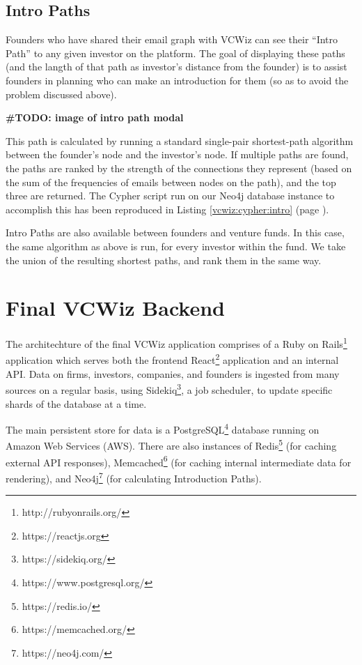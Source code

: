 \subsection{Intro Paths}

Founders who have shared their email graph with VCWiz can see their ``Intro Path'' to any given investor on the platform. The goal of displaying these paths (and the langth of that path as investor's distance from the founder) is to assist founders in planning who can make an introduction for them (so as to avoid the problem discussed above).

\textbf{\#TODO: image of intro path modal}

This path is calculated by running a standard single-pair shortest-path algorithm between the founder's node and the investor's node. If multiple paths are found, the paths are ranked by the strength of the connections they represent (based on the sum of the frequencies of emails between nodes on the path), and the top three are returned. The Cypher script run on our Neo4j database instance to accomplish this has been reproduced in Listing \ref{vcwiz:cypher:intro} (page \pageref{vcwiz:cypher:intro}).

Intro Paths are also available between founders and venture funds. In this case, the same algorithm as above is run, for every investor within the fund. We take the union of the resulting shortest paths, and rank them in the same way.

\section{Final VCWiz Backend}

The architechture of the final VCWiz application comprises of a Ruby on Rails\footnote{http://rubyonrails.org/} application which serves both the frontend React\footnote{https://reactjs.org} application and an internal API. Data on firms, investors, companies, and founders is ingested from many sources on a regular basis, using Sidekiq\footnote{https://sidekiq.org/}, a job scheduler, to update specific shards of the database at a time.


The main persistent store for data is a PostgreSQL\footnote{https://www.postgresql.org/} database running on Amazon Web Services (AWS). There are also instances of Redis\footnote{https://redis.io/} (for caching external API responses), Memcached\footnote{https://memcached.org/} (for caching internal intermediate data for rendering), and Neo4j\footnote{https://neo4j.com/} (for calculating Introduction Paths).

